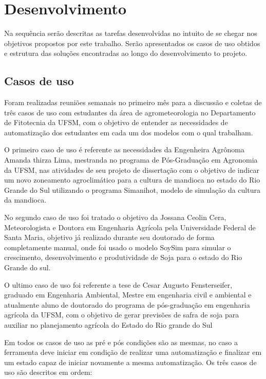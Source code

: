 \documentclass[12pt]{article}
\begin{document}
	\section{Desenvolvimento}

	Na sequência serão descritas as tarefas desenvolvidas no intuito de se chegar nos objetivos propostos por este trabalho. Serão apresentados os casos de uso obtidos e estrutura das soluções encontradas ao longo do desenvolvimento to projeto.
	
	\subsection {Casos de uso}
	
	Foram realizadas reuniões semanais no primeiro mês para a discussão e coletas de três casos de uso com estudantes da área de agrometeorologia no Departamento de Fitotecnia da UFSM, com o objetivo de entender as necessidades de automatização dos estudantes em cada um dos modelos com o qual trabalham. 
	
	O primeiro caso de uso é referente as necessidades da Engenheira Agrônoma Amanda thirza Lima, mestranda no programa de Pós-Graduação em Agronomia da UFSM, nas atividades de seu projeto de dissertação com o objetivo de indicar um novo zoneamento agroclimático para a cultura de mandioca no estado do Rio Grande do Sul utilizando o programa Simanihot, modelo de simulação da cultura da mandioca.
	
	No segundo caso de uso foi tratado o objetivo da Jossana Ceolin Cera, Meteorologista e Doutora em Engenharia Agrícola pela Universidade Federal de Santa Maria, objetivo já realizado durante seu doutorado de forma completamente manual, onde foi usado o modelo SoySim para simular o crescimento, desenvolvimento e produtividade de Soja para o estado do Rio Grande do sul.

	O ultimo caso de uso foi referente a tese de Cesar Augusto Fensterseifer, graduado em Engenharia Ambiental, Mestre em engenharia civil e ambiental e atualmente aluno de doutorado do programa de pós-graduação em engenharia agrícola da UFSM, com o objetivo de gerar previsões de safra de soja para auxiliar no planejamento agrícola do Estado do Rio grande do Sul 
	
	Em todos os casos de uso as pré e pós condições são as mesmas, no caso a ferramenta deve iniciar em condição de realizar uma automatização e finalizar em um estado capaz de iniciar novamente a mesma automatização. Os três casos de uso são descritos em ordem:
	\bigskip \bigskip \bigskip \bigskip
\end{document}
